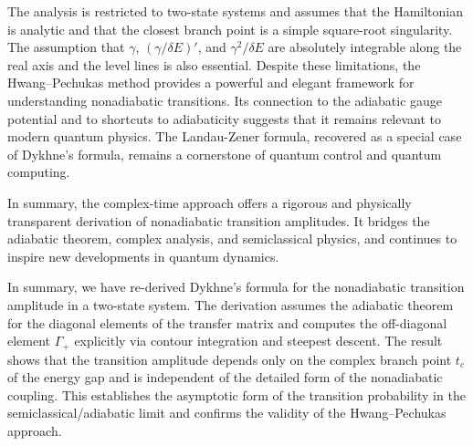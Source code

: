 \documentclass[12pt,a4paper]{article}
\begin{document}
	The analysis is restricted to two-state systems and assumes that the Hamiltonian is analytic and that the closest branch point is a simple square-root singularity. The assumption that $\gamma$, $(\gamma/\delta E)'$, and $\gamma^2/\delta E$ are absolutely integrable along the real axis and the level lines is also essential. Despite these limitations, the Hwang–Pechukas method provides a powerful and elegant framework for understanding nonadiabatic transitions. Its connection to the adiabatic gauge potential and to shortcuts to adiabaticity suggests that it remains relevant to modern quantum physics. The Landau-Zener formula, recovered as a special case of Dykhne's formula, remains a cornerstone of quantum control and quantum computing.
	
	In summary, the complex-time approach offers a rigorous and physically transparent derivation of nonadiabatic transition amplitudes. It bridges the adiabatic theorem, complex analysis, and semiclassical physics, and continues to inspire new developments in quantum dynamics.
	
	In summary, we have re-derived Dykhne's formula for the nonadiabatic transition amplitude in a two-state system. The derivation assumes the adiabatic theorem for the diagonal elements of the transfer matrix and computes the off-diagonal element $\Gamma_+$ explicitly via contour integration and steepest descent. The result shows that the transition amplitude depends only on the complex branch point $t_c$ of the energy gap and is independent of the detailed form of the nonadiabatic coupling. This establishes the asymptotic form of the transition probability in the semiclassical/adiabatic limit and confirms the validity of the Hwang–Pechukas approach.
\end{document}
